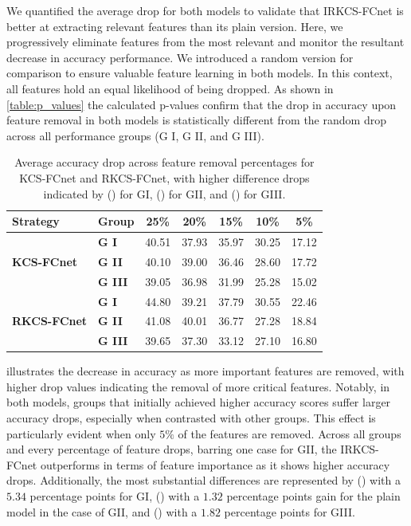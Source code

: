 We quantified the average drop for both models to validate that IRKCS-FCnet is better at extracting relevant features than its plain version. Here, we progressively eliminate features from the most relevant and monitor the resultant decrease in accuracy performance. We introduced a random version for comparison to ensure valuable feature learning in both models. In this context, all features hold an equal likelihood of being dropped. As shown in \cref{table:p_values} the calculated p-values confirm that the drop in accuracy upon feature removal in both models is statistically different from the random drop across all performance groups (G I, G II, and G III).





\begin{table}[h!]
\centering
\caption{Average accuracy drop across feature removal percentages for KCS-FCnet and RKCS-FCnet, with higher difference drops indicated by () for GI, () for GII, and () for GIII.}\label{table:average_drop}
\begin{tabular}{|l|l|c|c|c|c|c|}
\hline
\textbf{Strategy} & \textbf{Group} & \textbf{25\%} & \textbf{20\%} & \textbf{15\%} & \textbf{10\%} & \textbf{5\%} \\ \hline
\multirow{3}{*}{\textbf{KCS-FCnet}} & \textbf{G I} & 40.51 & 37.93 & 35.97 & 30.25 & 17.12 \\
 & \textbf{G II} & 40.10 & 39.00 & 36.46 & \cellcolor{GII!80}28.60 & 17.72 \\
 & \textbf{G III} & 39.05 & 36.98 & 31.99 & 25.28 & 15.02 \\ \hline
\multirow{3}{*}{\textbf{RKCS-FCnet}} & \textbf{G I} &  44.80 & 39.21 &  37.79 &  30.55 & \cellcolor{GI!80} 22.46 \\
 & \textbf{G II} & 41.08 & 40.01 & 36.77 & 27.28 & 18.84 \\
 & \textbf{G III} & 39.65 & 37.30 & 33.12 & \cellcolor{GIII!80}27.10 & 16.80 \\ \hline
\end{tabular}
\end{table}


 illustrates the decrease in accuracy as more important features are removed, with higher drop values indicating the removal of more critical features. Notably, in both models, groups that initially achieved higher accuracy scores suffer larger accuracy drops, especially when contrasted with other groups. This effect is particularly evident when only $5\%$ of the features are removed. Across all groups and every percentage of feature drops, barring one case for GII, the IRKCS-FCnet outperforms in terms of feature importance as it shows higher accuracy drops. Additionally, the most substantial differences are represented by () with a $5.34$ percentage points for GI, () with a $1.32$ percentage points gain for the plain model in the case of GII, and () with a $1.82$ percentage points for GIII.

